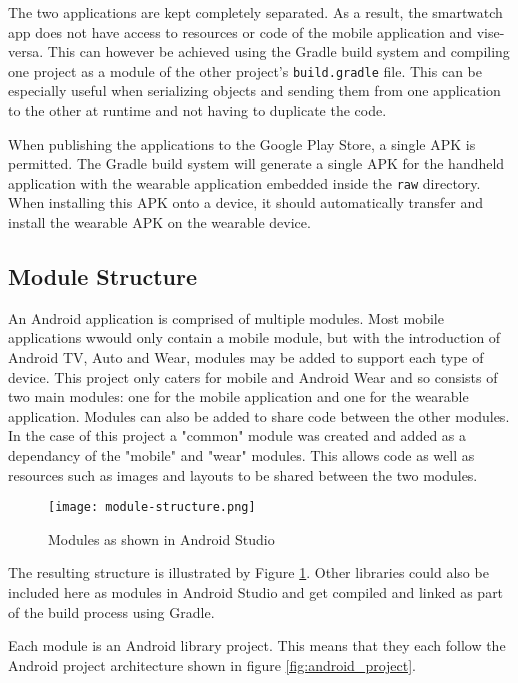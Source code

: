 The two applications are kept completely separated. As a result, the smartwatch
app does not have access to resources or code of the mobile application and
vise-versa. This can however be achieved using the Gradle build system and
compiling one project as a module of the other project's \texttt{build.gradle}
file. This can be especially useful when serializing objects and sending them
from one application to the other at runtime and not having to duplicate the
code.

When publishing the applications to the Google Play Store, a single APK is
permitted. The Gradle build system will generate a single APK for the handheld
application with the wearable application embedded inside the \texttt{raw}
directory. When installing this APK onto a device, it should automatically
transfer and install the wearable APK on the wearable device.

\subsection{Module Structure}

An Android application is comprised of multiple modules. Most mobile
applications wwould only contain a mobile module, but with the introduction of
Android TV, Auto and Wear, modules may be added to support each type of device.
This project only caters for mobile and Android Wear and so consists of two
main modules: one for the mobile application and one for the wearable
application. Modules can also be added to share code between the other modules.
In the case of this project a "common" module was created and added as a
dependancy of the "mobile" and "wear" modules. This allows code as well as
resources such as images and layouts to be shared between the two modules.

\begin{figure}
    \centering
    \texttt{[image: module-structure.png]}
    \caption{Modules as shown in Android Studio}
    \label{fig:desktop_module_structure}
\end{figure}

The resulting structure is illustrated by Figure
\ref{fig:desktop_module_structure}. Other libraries could also be included here
as modules in Android Studio and get compiled and linked as part of the build
process using Gradle.

Each module is an Android library project. This means that they each follow the
Android project architecture shown in figure \ref{fig:android_project}.

